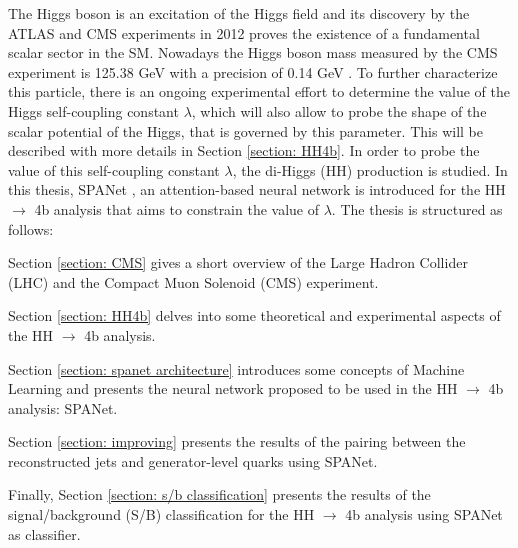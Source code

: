 The Higgs boson is an excitation of the Higgs field and its discovery by the ATLAS \cite{ATLASdecouvhiggs} and CMS \cite{CMShiggsdecouv} experiments in 2012 proves the existence of a fundamental scalar sector in the SM. Nowadays the Higgs boson mass measured by the CMS experiment is 125.38 GeV with a precision of 0.14 GeV \cite{PreciseCMSmeasHiggs}. To further characterize this particle, there is an ongoing experimental effort to determine the value of the Higgs self-coupling constant $\lambda$, which will also allow to probe the shape of the scalar potential of the Higgs, that is governed by this parameter. This will be described with more details in Section \ref{section: HH4b}. In order to probe the value of this self-coupling constant $\lambda$, the di-Higgs (HH) production is studied. In this thesis, SPANet \cite{SPANet}, an attention-based neural network is introduced for the HH $\to$ 4b analysis that aims to constrain the value of $\lambda$. The thesis is structured as follows:

Section \ref{section: CMS} gives a short overview of the Large Hadron Collider (LHC) and the Compact Muon Solenoid (CMS) experiment.

Section \ref{section: HH4b} delves into some theoretical and experimental aspects of the HH $\to$ 4b analysis.

Section \ref{section: spanet architecture} introduces some concepts of Machine Learning and presents the neural network proposed to be used in the HH $\to$ 4b analysis: SPANet.

Section \ref{section: improving} presents the results of the pairing between the reconstructed jets and generator-level quarks using SPANet.

Finally, Section \ref{section: s/b classification} presents the results of the signal/background (S/B) classification for the HH $\to$ 4b analysis using SPANet as classifier.



